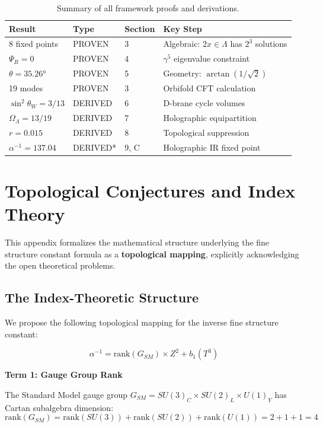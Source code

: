 \documentclass[12pt,a4paper]{article}
\newcommand{\OmegaL}{\Omega_\Lambda}
\newcommand{\sinW}{\sin^2\theta_W}
\newcommand{\Zsq}{Z^2}
\begin{document}
\begin{table}[H]
\centering
\begin{tabular}{llll}
\toprule
\textbf{Result} & \textbf{Type} & \textbf{Section} & \textbf{Key Step} \\
\midrule
8 fixed points & PROVEN & 3 & Algebraic: $2x \in \Lambda$ has $2^3$ solutions \\
$\Psi_R = 0$ & PROVEN & 4 & $\gamma^5$ eigenvalue constraint \\
$\theta = 35.26°$ & PROVEN & 5 & Geometry: $\arctan(1/\sqrt{2})$ \\
19 modes & PROVEN & 3 & Orbifold CFT calculation \\
$\sinW = 3/13$ & DERIVED & 6 & D-brane cycle volumes \\
$\OmegaL = 13/19$ & DERIVED & 7 & Holographic equipartition \\
$r = 0.015$ & DERIVED & 8 & Topological suppression \\
$\alpha^{-1} = 137.04$ & DERIVED* & 9, C & Holographic IR fixed point \\
\bottomrule
\end{tabular}
\caption{Summary of all framework proofs and derivations.}
\end{table}

\section{Topological Conjectures and Index Theory}
\label{app:conjectures}

This appendix formalizes the mathematical structure underlying the fine structure constant formula as a \textbf{topological mapping}, explicitly acknowledging the open theoretical problems.

\subsection{The Index-Theoretic Structure}

We propose the following topological mapping for the inverse fine structure constant:

\begin{equation}
\boxed{\alpha^{-1} = \text{rank}(G_{SM}) \times \Zsq + b_1(T^3)}
\end{equation}

\textbf{Term 1: Gauge Group Rank}

The Standard Model gauge group $G_{SM} = SU(3)_C \times SU(2)_L \times U(1)_Y$ has Cartan subalgebra dimension:
\begin{equation}
\text{rank}(G_{SM}) = \text{rank}(SU(3)) + \text{rank}(SU(2)) + \text{rank}(U(1)) = 2 + 1 + 1 = 4
\end{equation}
\end{document}
